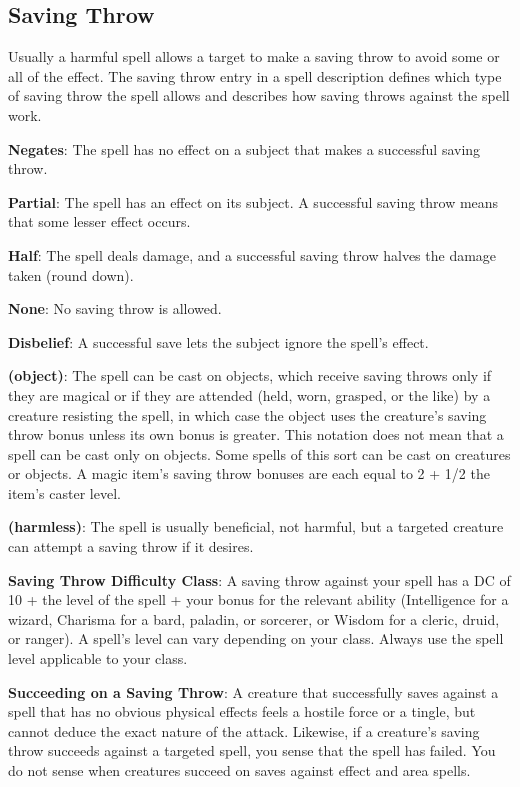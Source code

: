 \subsection{Saving Throw}

				
Usually a harmful spell allows a target to make a saving throw to avoid some or all of the effect. The saving throw entry in a spell description defines which type of saving throw the spell allows and describes how saving throws against the spell work.
				
\textbf{Negates}: The spell has no effect on a subject that makes a successful saving throw.
				
\textbf{Partial}: The spell has an effect on its subject. A successful saving throw means that some lesser effect occurs.
				
\textbf{Half}: The spell deals damage, and a successful saving throw halves the damage taken (round down).
				
\textbf{None}: No saving throw is allowed.
				
\textbf{Disbelief}: A successful save lets the subject ignore the spell's effect. 
				
\textbf{(object)}: The spell can be cast on objects, which receive saving throws only if they are magical or if they are attended (held, worn, grasped, or the like) by a creature resisting the spell, in which case the object uses the creature's saving throw bonus unless its own bonus is greater. This notation does not mean that a spell can be cast only on objects. Some spells of this sort can be cast on creatures or objects. A magic item's saving throw bonuses are each equal to 2 + 1/2 the item's caster level. 
				
\textbf{(harmless)}: The spell is usually beneficial, not harmful, but a targeted creature can attempt a saving throw if it desires.
				
\textbf{Saving Throw Difficulty Class}: A saving throw against your spell has a DC of 10 + the level of the spell + your bonus for the relevant ability (Intelligence for a wizard, Charisma for a bard, paladin, or sorcerer, or Wisdom for a cleric, druid, or ranger). A spell's level can vary depending on your class. Always use the spell level applicable to your class.
				
\textbf{Succeeding on a Saving Throw}: A creature that successfully saves against a spell that has no obvious physical effects feels a hostile force or a tingle, but cannot deduce the exact nature of the attack. Likewise, if a creature's saving throw succeeds against a targeted spell, you sense that the spell has failed. You do not sense when creatures succeed on saves against effect and area spells.
				
